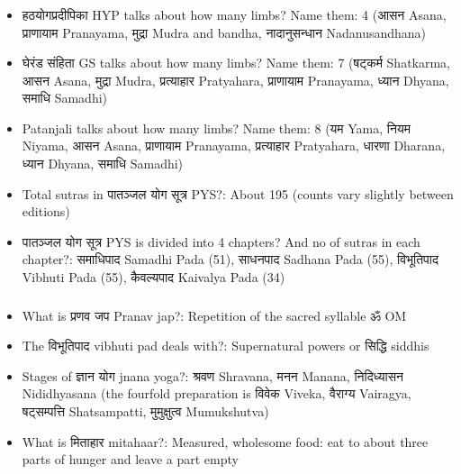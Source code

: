 \begin{frame}[fragile]\frametitle{}
\begin{itemize}
\item हठयोगप्रदीपिका HYP talks about how many limbs? Name them: 4 (आसन Asana, प्राणायाम Pranayama, मुद्रा Mudra and bandha, नादानुसन्धान Nadanusandhana)
\item घेरंड संहिता GS talks about how many limbs? Name them: 7 (षट्कर्म Shatkarma, आसन Asana, मुद्रा Mudra, प्रत्याहार Pratyahara, प्राणायाम Pranayama, ध्यान Dhyana, समाधि Samadhi)
\item Patanjali talks about how many limbs? Name them: 8 (यम Yama, नियम Niyama, आसन Asana, प्राणायाम Pranayama, प्रत्याहार Pratyahara, धारणा Dharana, ध्यान Dhyana, समाधि Samadhi)
\item Total sutras in पातञ्जल योग सूत्र PYS?: About 195 (counts vary slightly between editions)
\item पातञ्जल योग सूत्र PYS is divided into 4 chapters? And no of sutras in each chapter?: समाधिपाद Samadhi Pada (51), साधनपाद Sadhana Pada (55), विभूतिपाद Vibhuti Pada (55), कैवल्यपाद Kaivalya Pada (34)
\end{itemize}
\end{frame}

\begin{frame}[fragile]\frametitle{}
\begin{itemize}
\item What is प्रणव जप Pranav jap?: Repetition of the sacred syllable ॐ OM
\item The विभूतिपाद vibhuti pad deals with?: Supernatural powers or सिद्धि siddhis
\item Stages of ज्ञान योग jnana yoga?: श्रवण Shravana, मनन Manana, निदिध्यासन Nididhyasana (the fourfold preparation is विवेक Viveka, वैराग्य Vairagya, षट्सम्पत्ति Shatsampatti, मुमुक्षुत्व Mumukshutva)
\item What is मिताहार mitahaar?: Measured, wholesome food: eat to about three parts of hunger and leave a part empty
\end{itemize}
\end{frame}

